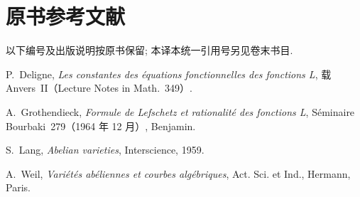 \section*{原书参考文献}
\begingroup\small\raggedright
\noindent 以下编号及出版说明按原书保留; 本译本统一引用号另见卷末书目.
\begin{enumerate}[{[1]}]
\item P.~Deligne, \emph{Les constantes des équations fonctionnelles des fonctions L}, 载 Anvers~II（Lecture Notes in Math.~349）.
\item A.~Grothendieck, \emph{Formule de Lefschetz et rationalité des fonctions L}, Séminaire Bourbaki~279（1964 年 12 月）, Benjamin.
\item S.~Lang, \emph{Abelian varieties}, Interscience, 1959.
\item A.~Weil, \emph{Variétés abéliennes et courbes algébriques}, Act. Sci. et Ind., Hermann, Paris.
\end{enumerate}
\endgroup
